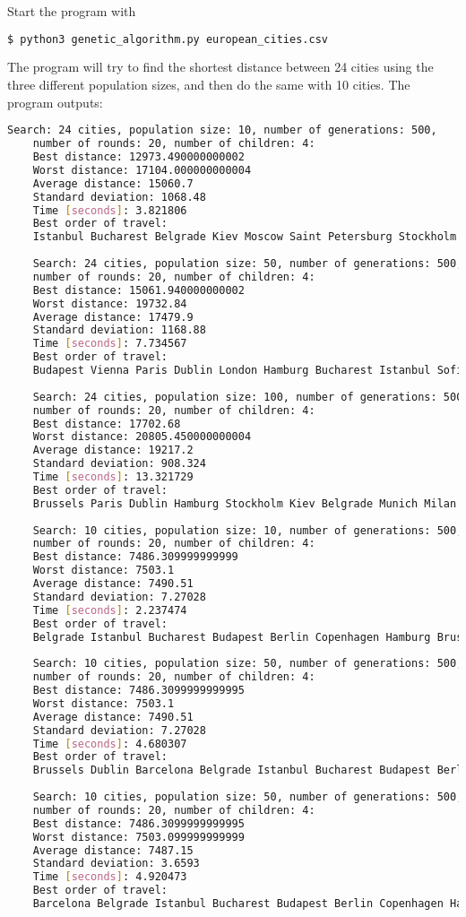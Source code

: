 \documentclass{article}
\begin{document}
Start the program with
\begin{lstlisting}[language=bash]
	$ python3 genetic_algorithm.py european_cities.csv 
\end{lstlisting}
The program will try to find the shortest distance between 24 cities using the three different population sizes, and then do the same with 10 cities. The program outputs:
\begin{lstlisting}[language=bash]
	Search: 24 cities, population size: 10, number of generations: 500, 
	number of rounds: 20, number of children: 4: 
	Best distance: 12973.490000000002
	Worst distance: 17104.000000000004
	Average distance: 15060.7
	Standard deviation: 1068.48
	Time [seconds]: 3.821806
	Best order of travel: 
	Istanbul Bucharest Belgrade Kiev Moscow Saint Petersburg Stockholm Warsaw 			Berlin Copenhagen Hamburg Prague Vienna Budapest Milan Paris Madrid 				Barcelona Dublin London Brussels Munich Rome Istanbul
 
	Search: 24 cities, population size: 50, number of generations: 500, 
	number of rounds: 20, number of children: 4: 
	Best distance: 15061.940000000002
	Worst distance: 19732.84
	Average distance: 17479.9
	Standard deviation: 1168.88
	Time [seconds]: 7.734567
	Best order of travel: 
	Budapest Vienna Paris Dublin London Hamburg Bucharest Istanbul Sofia Warsaw 		Berlin Copenhagen Stockholm Saint Petersburg Moscow Kiev Belgrade Madrid 			Rome Barcelona Milan Prague Brussels Budapest
 
	Search: 24 cities, population size: 100, number of generations: 500, 
	number of rounds: 20, number of children: 4: 
	Best distance: 17702.68
	Worst distance: 20805.450000000004
	Average distance: 19217.2
	Standard deviation: 908.324
	Time [seconds]: 13.321729
	Best order of travel: 
	Brussels Paris Dublin Hamburg Stockholm Kiev Belgrade Munich Milan London 			Barcelona Madrid Rome Warsaw Vienna Prague Budapest Sofia Istanbul Bucharest 	Moscow Saint Petersburg Copenhagen Brussels
 
	Search: 10 cities, population size: 10, number of generations: 500, 
	number of rounds: 20, number of children: 4: 
	Best distance: 7486.309999999999
	Worst distance: 7503.1
	Average distance: 7490.51
	Standard deviation: 7.27028
	Time [seconds]: 2.237474
	Best order of travel: 
	Belgrade Istanbul Bucharest Budapest Berlin Copenhagen Hamburg Brussels 			Dublin Belgrade
 
	Search: 10 cities, population size: 50, number of generations: 500, 
	number of rounds: 20, number of children: 4: 
	Best distance: 7486.3099999999995
	Worst distance: 7503.1
	Average distance: 7490.51
	Standard deviation: 7.27028
	Time [seconds]: 4.680307
	Best order of travel: 
	Brussels Dublin Barcelona Belgrade Istanbul Bucharest Budapest Berlin 				Copenhagen Brussels
 
	Search: 10 cities, population size: 50, number of generations: 500, 
	number of rounds: 20, number of children: 4: 
	Best distance: 7486.3099999999995
	Worst distance: 7503.099999999999
	Average distance: 7487.15
	Standard deviation: 3.6593
	Time [seconds]: 4.920473
	Best order of travel: 
	Barcelona Belgrade Istanbul Bucharest Budapest Berlin Copenhagen Hamburg 			Brussels Barcelona
\end{lstlisting}
\end{document}
